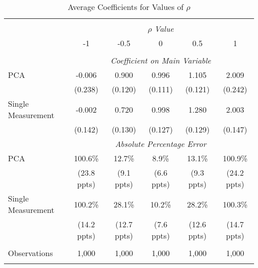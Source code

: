 \begin{table}[!htbp] \centering
  \caption{Average Coefficients for Values of $\rho$ \label{sim_rho_2}}
\begin{tabular}{@{\extracolsep{5pt}}lccccc}
\\[-1.8ex]\hline
\hline \\[-1.8ex]
& \multicolumn{5}{c}{$\rho$ \textit{ Value}} \
\cr 
\\[-1.8ex] & -1 & -0.5 & 0 & 0.5 & 1 \\
\hline \\[-1.8ex]
& \multicolumn{5}{c}{\textit{Coefficient on Main Variable}} \\
 PCA & -0.006 & 0.900 & 0.996 & 1.105 & 2.009  \\
  & (0.238) & (0.120) & (0.111) & (0.121) & (0.242)\\
  Single Measurement & -0.002 & 0.720 & 0.998 & 1.280 & 2.003  \\
  & (0.142) & (0.130) & (0.127) & (0.129) & (0.147)\\
& \multicolumn{5}{c}{\textit{Absolute Percentage Error}} \\
  PCA & 100.6\% & 12.7\% & 8.9\% & 13.1\% & 100.9\% \\
   & (23.8 ppts) & (9.1 ppts) & (6.6 ppts) & (9.3 ppts) & (24.2 ppts)\\
  Single Measurement & 100.2\% & 28.1\% & 10.2\% & 28.2\% & 100.3\%  \\
  & (14.2 ppts) & (12.7 ppts) & (7.6 ppts) & (12.6 ppts) & (14.7 ppts)\\
\hline \\[-1.8ex]
 Observations & 1,000 & 1,000 & 1,000 & 1,000 & 1,000\\
\hline
\hline \\[-1.8ex]
\end{tabular}
\end{table}
